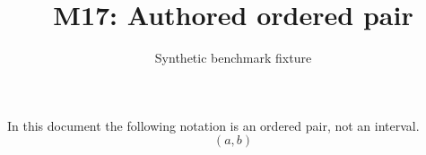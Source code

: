 \documentclass{article}
\title{M17: Authored ordered pair}
\author{Synthetic benchmark fixture}
\date{}
\begin{document}
\maketitle
In this document the following notation is an ordered pair, not an interval.
\[(a,b)\]
\end{document}
